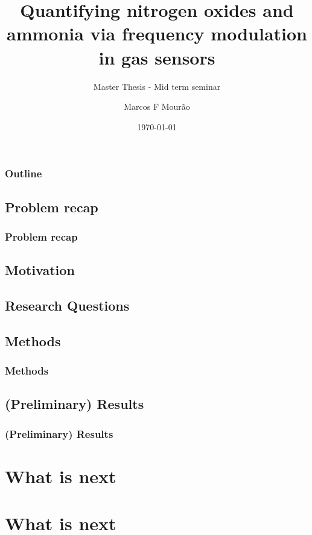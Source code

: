 \documentclass{beamer}
\title{Quantifying nitrogen oxides and ammonia via frequency modulation in gas sensors}
\subtitle{Master Thesis - Mid term seminar}
\author{Marcos F Mourão}
\date{\today}
\begin{document}
	\begin{frame}
		\titlepage
	\end{frame}

\begin{frame}
	\frametitle{Outline}
	\tableofcontents
\end{frame}

\begin{frame}
	\section{Problem recap}
	\frametitle{Problem recap}
	
	\subsection{Motivation}
	
	\subsection{Research Questions}
\end{frame}

\begin{frame}
	\section{Methods}
	\frametitle{Methods}
	
\end{frame}

\begin{frame}
	\section{(Preliminary) Results}
	\frametitle{(Preliminary) Results}
\end{frame}

\begin{frame}
	\section{What is next}
	\section{What is next}
\end{frame}
\end{document}
